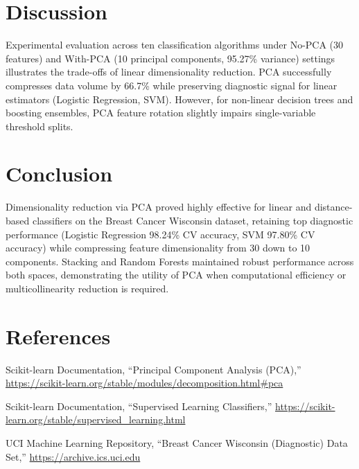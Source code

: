 \documentclass[12pt,a4paper]{article}
\begin{document}
\section{Discussion}
Experimental evaluation across ten classification algorithms under No-PCA (30 features) and With-PCA (10 principal components, 95.27\% variance) settings illustrates the trade-offs of linear dimensionality reduction. PCA successfully compresses data volume by 66.7\% while preserving diagnostic signal for linear estimators (Logistic Regression, SVM). However, for non-linear decision trees and boosting ensembles, PCA feature rotation slightly impairs single-variable threshold splits.

\section{Conclusion}
Dimensionality reduction via PCA proved highly effective for linear and distance-based classifiers on the Breast Cancer Wisconsin dataset, retaining top diagnostic performance (Logistic Regression 98.24\% CV accuracy, SVM 97.80\% CV accuracy) while compressing feature dimensionality from 30 down to 10 components. Stacking and Random Forests maintained robust performance across both spaces, demonstrating the utility of PCA when computational efficiency or multicollinearity reduction is required.

\section{References}
\begin{enumerate}[label={[\arabic*]}]
\item Scikit-learn Documentation, ``Principal Component Analysis (PCA),'' \url{https://scikit-learn.org/stable/modules/decomposition.html#pca}
\item Scikit-learn Documentation, ``Supervised Learning Classifiers,'' \url{https://scikit-learn.org/stable/supervised_learning.html}
\item UCI Machine Learning Repository, ``Breast Cancer Wisconsin (Diagnostic) Data Set,'' \url{https://archive.ics.uci.edu}
\end{enumerate}
\end{document}
